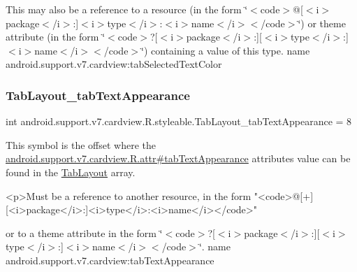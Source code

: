 This may also be a reference to a resource (in the form \char`\"{}$<$code$>$@\mbox{[}$<$i$>$package$<$/i$>$\+:\mbox{]}$<$i$>$type$<$/i$>$\+:$<$i$>$name$<$/i$>$$<$/code$>$\char`\"{}) or theme attribute (in the form \char`\"{}$<$code$>$?\mbox{[}$<$i$>$package$<$/i$>$\+:\mbox{]}\mbox{[}$<$i$>$type$<$/i$>$\+:\mbox{]}$<$i$>$name$<$/i$>$$<$/code$>$\char`\"{}) containing a value of this type.  name android.\+support.\+v7.\+cardview\+:tab\+Selected\+Text\+Color \mbox{\label{classandroid_1_1support_1_1v7_1_1cardview_1_1R_1_1styleable_aac67299d9b8c00968768c8064795f58f}} 
\subsubsection{\texorpdfstring{Tab\+Layout\+\_\+tab\+Text\+Appearance}{TabLayout\_tabTextAppearance}}
{\footnotesize\ttfamily int android.\+support.\+v7.\+cardview.\+R.\+styleable.\+Tab\+Layout\+\_\+tab\+Text\+Appearance = 8\hspace{0.3cm}{\ttfamily [static]}}

This symbol is the offset where the \hyperlink{classandroid_1_1support_1_1v7_1_1cardview_1_1R_1_1attr_a991714806007fb1bbebad5f2c6fc6155}{android.\+support.\+v7.\+cardview.\+R.\+attr\#tab\+Text\+Appearance} attribute\textquotesingle{}s value can be found in the \hyperlink{classandroid_1_1support_1_1v7_1_1cardview_1_1R_1_1styleable_afa0dc9366603eaec9e38d99273ba8512}{Tab\+Layout} array.

\begin{DoxyVerb}      <p>Must be a reference to another resource, in the form "<code>@[+][<i>package</i>:]<i>type</i>:<i>name</i></code>"
\end{DoxyVerb}
 or to a theme attribute in the form \char`\"{}$<$code$>$?\mbox{[}$<$i$>$package$<$/i$>$\+:\mbox{]}\mbox{[}$<$i$>$type$<$/i$>$\+:\mbox{]}$<$i$>$name$<$/i$>$$<$/code$>$\char`\"{}.  name android.\+support.\+v7.\+cardview\+:tab\+Text\+Appearance \mbox{\label{classandroid_1_1support_1_1v7_1_1cardview_1_1R_1_1styleable_a7fa5e53bc11e58338a76405ddc2a9fd8}} 
